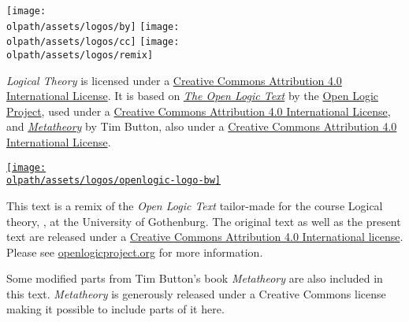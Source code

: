 \documentclass[a4paper]{memoir}
\newcommand{\olpath}{../../}
\begin{document}

\begin{titlingpage}

\vfill

\begin{minipage}[b]{.9cm}
\texttt{[image: \\olpath/assets/logos/by]}
\texttt{[image: \\olpath/assets/logos/cc]}
\texttt{[image: \\olpath/assets/logos/remix]}
\end{minipage}
\hspace{.3cm}
\begin{minipage}[b]{6.5cm}
\ollicensefont
\textit{Logical Theory} is licensed under a
\href{http://creativecommons.org/licenses/by/4.0/}{Creative Commons
  Attribution 4.0 International License}. It is based on
\textit{\href{https://github.com/OpenLogicProject/OpenLogic}{The Open
    Logic Text}} by the \href{http://openlogicproject.org/}{Open Logic
  Project}, used under a
\href{http://creativecommons.org/licenses/by/4.0/}{Creative Commons
  Attribution 4.0 International License}, and \textit{\href{http://people.ds.cam.ac.uk/tecb2/metatheory.shtml}{Metatheory}} by Tim Button, also under a \href{http://creativecommons.org/licenses/by/4.0/}{Creative Commons
  Attribution 4.0 International License}.
\end{minipage}
\hfill
\href{http://openlogicproject.org/}{\texttt{[image: \\olpath/assets/logos/openlogic-logo-bw]}}


\end{titlingpage}

\frontmatter
\pagestyle{ruled}

\thispagestyle{empty}%
\noindent This text is a remix of the \textit{Open Logic Text} tailor-made for the course Logical theory, , at the University of Gothenburg. The original text as well as the present text are released under a \href{http://creativecommons.org/licenses/by/4.0/}{Creative Commons
  Attribution 4.0 International license}. Please see \href{http://openlogicproject.org/}{openlogicproject.org} for
more information.

Some modified parts from Tim Button's book \textit{Metatheory} are also included in this text. \textit{Metatheory} is generously released under a Creative Commons license making it possible to include parts of it here.
\end{document}
